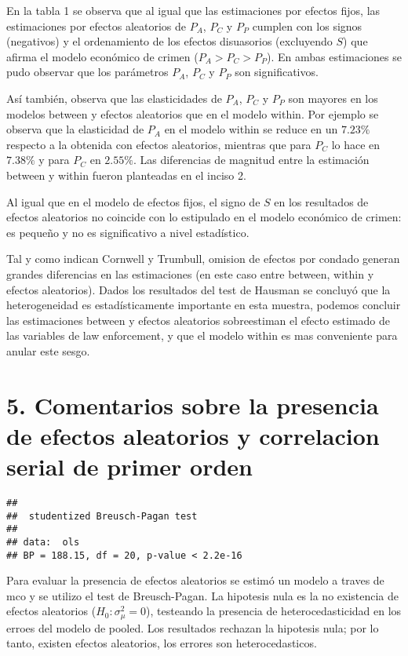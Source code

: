 \documentclass[
]{article}
\begin{document}
En la tabla 1 se observa que al igual que las estimaciones por efectos
fijos, las estimaciones por efectos aleatorios de \(P_A\), \(P_C\) y
\(P_P\) cumplen con los signos (negativos) y el ordenamiento de los
efectos disuasorios (excluyendo \(S\)) que afirma el modelo económico de
crimen (\(P_A>P_C>P_P\)). En ambas estimaciones se pudo observar que los
parámetros \(P_A\), \(P_C\) y \(P_P\) son significativos.

Así también, observa que las elasticidades de \(P_A\), \(P_C\) y \(P_P\)
son mayores en los modelos between y efectos aleatorios que en el modelo
within. Por ejemplo se observa que la elasticidad de \(P_A\) en el
modelo within se reduce en un \(7.23\%\) respecto a la obtenida con
efectos aleatorios, mientras que para \(P_C\) lo hace en \(7.38\%\) y
para \(P_C\) en \(2.55\%\). Las diferencias de magnitud entre la
estimación between y within fueron planteadas en el inciso 2.

Al igual que en el modelo de efectos fijos, el signo de \(S\) en los
resultados de efectos aleatorios no coincide con lo estipulado en el
modelo económico de crimen: es pequeño y no es significativo a nivel
estadístico.

Tal y como indican Cornwell y Trumbull, omision de efectos por condado
generan grandes diferencias en las estimaciones (en este caso entre
between, within y efectos aleatorios). Dados los resultados del test de
Hausman se concluyó que la heterogeneidad es estadísticamente importante
en esta muestra, podemos concluir las estimaciones between y efectos
aleatorios sobreestiman el efecto estimado de las variables de law
enforcement, y que el modelo within es mas conveniente para anular este
sesgo.

\hypertarget{comentarios-sobre-la-presencia-de-efectos-aleatorios-y-correlacion-serial-de-primer-orden}{%
\section{5. Comentarios sobre la presencia de efectos aleatorios y
correlacion serial de primer
orden}\label{comentarios-sobre-la-presencia-de-efectos-aleatorios-y-correlacion-serial-de-primer-orden}}

\begin{verbatim}
## 
##  studentized Breusch-Pagan test
## 
## data:  ols
## BP = 188.15, df = 20, p-value < 2.2e-16
\end{verbatim}

Para evaluar la presencia de efectos aleatorios se estimó un modelo a
traves de mco y se utilizo el test de Breusch-Pagan. La hipotesis nula
es la no existencia de efectos aleatorios (\(H_0: \sigma^2_\mu=0\)),
testeando la presencia de heterocedasticidad en los erroes del modelo de
pooled. Los resultados rechazan la hipotesis nula; por lo tanto, existen
efectos aleatorios, los errores son heterocedasticos.
\end{document}
